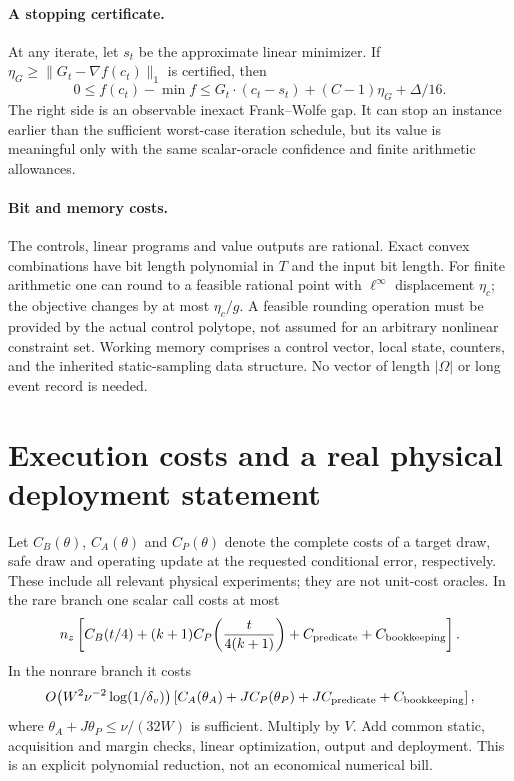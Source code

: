 \documentclass[11pt]{article}
\begin{document}
\paragraph{A stopping certificate.}
At any iterate, let $s_t$ be the approximate linear minimizer. If
$\eta_G\ge\|G_t-\nabla f(c_t)\|_1$ is certified, then
\[
 0\le f(c_t)-\min f
 \le G_t\cdot(c_t-s_t)+(C-1)\eta_G+\Delta/16.
\]
The right side is an observable inexact Frank--Wolfe gap. It can stop an
instance earlier than the sufficient worst-case iteration schedule, but
its value is meaningful only with the same scalar-oracle confidence
and finite arithmetic allowances.

\paragraph{Bit and memory costs.}
The controls, linear programs and value outputs are rational. Exact
convex combinations have bit length polynomial in $T$ and the input
bit length. For finite arithmetic one can round to a feasible rational
point with $\ell^\infty$ displacement $\eta_c$; the objective changes by
at most $\eta_c/g$. A feasible rounding operation must be provided by
the actual control polytope, not assumed for an arbitrary nonlinear
constraint set. Working memory comprises a control vector, local state,
counters, and the inherited static-sampling data structure. No vector of
length $|\Omega|$ or long event record is needed.

\section{Execution costs and a real physical deployment statement}
\label{sec:physical}
Let $C_B(\theta)$, $C_A(\theta)$ and $C_P(\theta)$ denote the complete
costs of a target draw, safe draw and operating update at the requested
conditional error, respectively. These include all relevant physical
experiments; they are not unit-cost oracles. In the rare branch one scalar
call costs at most
\[
 n_z\left[C_B(t/4)+(k+1)C_P\!\left(\frac{t}{4(k+1)}\right)
               +C_{\rm predicate}+C_{\rm bookkeeping}\right].
\]
In the nonrare branch it costs
\[
 O\!\left(W^2\nu^{-2}\log(1/\delta_v)\right)
 \left[C_A(\theta_A)+J C_P(\theta_P)+J C_{\rm predicate}
                                      +C_{\rm bookkeeping}\right],
\]
where $\theta_A+J\theta_P\le\nu/(32W)$ is sufficient.
Multiply by $V$. Add common static, acquisition and margin checks,
linear optimization, output and deployment. This is an explicit
polynomial reduction, not an economical numerical bill.
\end{document}
